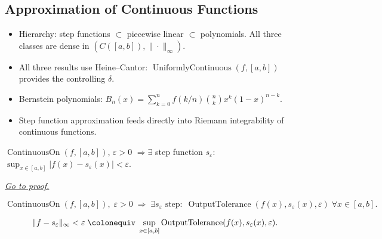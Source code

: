 
\subsection{Approximation of Continuous Functions}
\label{sec:approximation}

\begin{tcolorbox}[title={Toolkit --- Approximation}]
\begin{itemize}
  \item Hierarchy: step functions $\subset$ piecewise linear $\subset$
    polynomials. All three classes are dense in $(C([a,b]),\|\cdot\|_\infty)$.
  \item All three results use Heine--Cantor: $\operatorname{UniformlyContinuous}(f,[a,b])$
    provides the controlling $\delta$.
  \item Bernstein polynomials: $B_n(x)=\sum_{k=0}^n f(k/n)\binom{n}{k}x^k(1-x)^{n-k}$.
  \item Step function approximation feeds directly into Riemann
    integrability of continuous functions.
\end{itemize}
\end{tcolorbox}


\begin{theorem}
\label{thm:step-function-approximation}
$\operatorname{ContinuousOn}(f,[a,b])$, $\varepsilon>0$
$\Rightarrow\exists$ step function $s_\varepsilon$:
$\sup_{x\in[a,b]}|f(x)-s_\varepsilon(x)|<\varepsilon$.

\smallskip\noindent
\hyperref[prf:step-function-approximation]{\textit{Go to proof.}}
\end{theorem}

\begin{remark*}
\[
  \operatorname{ContinuousOn}(f,[a,b]),\;\varepsilon>0
  \;\Rightarrow\;
  \exists s_\varepsilon\text{ step}:\;
  \operatorname{OutputTolerance}(f(x),s_\varepsilon(x),\varepsilon)
  \;\forall x\in[a,b].
\]
\end{remark*}

\begin{remark*}
\[
  \|f-s_\varepsilon\|_\infty<\varepsilon
  \;\colonequiv\;
  \sup_{x\in[a,b]}\operatorname{OutputTolerance}(f(x),s_\varepsilon(x),\varepsilon).
\]
\end{remark*}

